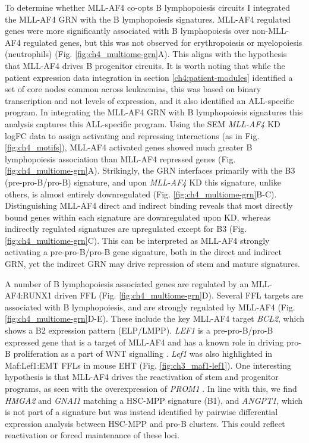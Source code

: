 To determine whether MLL-AF4 co-opts B lymphopoiesis circuits I integrated the MLL-AF4 GRN with the B lymphopoiesis signatures. MLL-AF4 regulated genes were more significantly associated with B lymphopoiesis over non-MLL-AF4 regulated genes, but this was not observed for erythropoiesis or myelopoiesis (neutrophils) (Fig. \ref{fig:ch4_multiome-grn}A). This aligns with the hypothesis that MLL-AF4 drives B progenitor circuits. It is worth noting that while the patient expression data integration in section \ref{ch4:patient-modules} identified a set of core nodes common across leukaemias, this was based on binary transcription and not levels of expression, and it also identified an ALL-specific program. In integrating the MLL-AF4 GRN with B lymphopoiesis signatures this analysis captures this ALL-specific program. Using the SEM \textit{MLL-AF4} KD logFC data to assign activating and repressing interactions (as in Fig. \ref{fig:ch4_motifs}), MLL-AF4 activated genes showed much greater B lymphopoiesis association than MLL-AF4 repressed genes (Fig. \ref{fig:ch4_multiome-grn}A). Strikingly, the GRN interfaces primarily with the B3 (pre-pro-B/pro-B) signature, and upon \textit{MLL-AF4} KD this signature, unlike others, is almost entirely downregulated (Fig. \ref{fig:ch4_multiome-grn}B-C). Distinguishing MLL-AF4 direct and indirect binding reveals that most directly bound genes within each signature are downregulated upon KD, whereas indirectly regulated signatures are upregulated except for B3 (Fig. \ref{fig:ch4_multiome-grn}C). This can be interpreted as MLL-AF4 strongly activating a pre-pro-B/pro-B gene signature, both in the direct and indirect GRN, yet the indirect GRN may drive repression of stem and mature signatures. 

A number of B lymphopoiesis associated genes are regulated by an MLL-AF4:RUNX1 driven FFL (Fig. \ref{fig:ch4_multiome-grn}D). Several FFL targets are associated with B lymphopoiesis, and are strongly regulated by MLL-AF4 (Fig. \ref{fig:ch4_multiome-grn}D-E). These include the key MLL-AF4 target \textit{BCL2}, which shows a B2 expression pattern (ELP/LMPP). \textit{LEF1} is a pre-pro-B/pro-B expressed gene that is a target of MLL-AF4 \citep{kerry_mll-af4_2017} and has a known role in driving pro-B proliferation as a part of WNT signalling \citep{reya_wnt_2000}. \textit{Lef1} was also highlighted in Maf:Lef1:EMT FFLs in mouse EHT (Fig. \ref{fig:ch3_maf1-lef1}). One interesting hypothesis is that MLL-AF4 drives the reactivation of stem and progenitor programs, as seen with the overexpression of \textit{PROM1} \citep{godfrey_h3k79me23_2021, mak_mixed_2012, obyrne_discovery_2019}. In line with this, we find \textit{HMGA2} and \textit{GNAI1} matching a HSC-MPP signature (B1), and \textit{ANGPT1}, which is not part of a signature but was instead identified by pairwise differential expression analysis between HSC-MPP and pro-B clusters. This could reflect reactivation or forced maintenance of these loci. 

